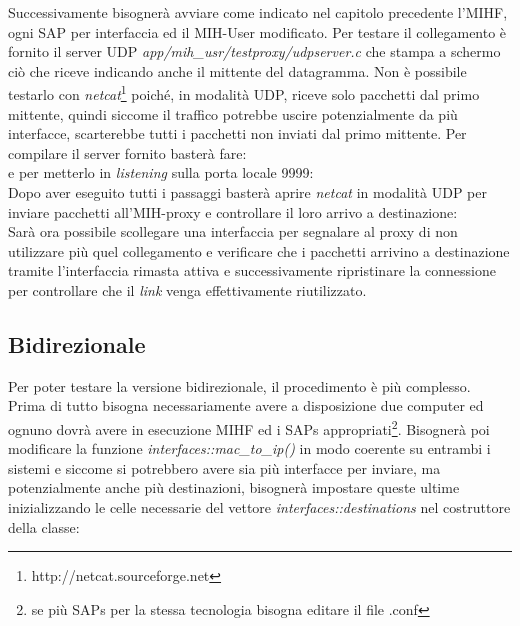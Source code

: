 Successivamente bisognerà avviare come indicato nel capitolo precedente l'MIHF, ogni SAP per interfaccia ed il MIH-User modificato. Per testare il collegamento è fornito il server UDP {\em app/mih\_usr/testproxy/udpserver.c} che stampa a schermo ciò che riceve indicando anche il mittente del datagramma. Non è possibile testarlo con {\em netcat}\footnote{http://netcat.sourceforge.net} poiché, in modalità UDP, riceve solo pacchetti dal primo mittente, quindi siccome il traffico potrebbe uscire potenzialmente da più interfacce, scarterebbe tutti i pacchetti non inviati dal primo mittente. Per compilare il server fornito basterà fare:\\
e per metterlo in {\em listening} sulla porta locale 9999:\\
Dopo aver eseguito tutti i passaggi basterà aprire {\em netcat} in modalità UDP per inviare pacchetti all'MIH-proxy e controllare il loro arrivo a destinazione:\\
Sarà ora possibile scollegare una interfaccia per segnalare al proxy di non utilizzare più quel collegamento e verificare che i pacchetti arrivino a destinazione tramite l'interfaccia rimasta attiva e successivamente ripristinare la connessione per controllare che il {\em link} venga effettivamente riutilizzato.

\subsection{Bidirezionale}

Per poter testare la versione bidirezionale, il procedimento è più complesso. Prima di tutto bisogna necessariamente avere a disposizione due computer ed ognuno dovrà avere in esecuzione MIHF ed i SAPs appropriati\footnote{se più SAPs per la stessa tecnologia bisogna editare il file .conf}. Bisognerà poi modificare la funzione {\em interfaces::mac\_to\_ip()} in modo coerente su entrambi i sistemi e siccome si potrebbero avere sia più interfacce per inviare, ma potenzialmente anche più destinazioni, bisognerà impostare queste ultime inizializzando le celle necessarie del vettore {\em interfaces::destinations} nel costruttore della classe:

